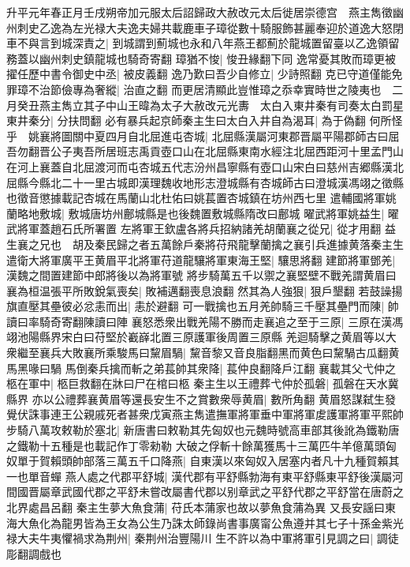 升平元年春正月壬戌朔帝加元服太后詔歸政大赦改元太后徙居崇德宫　燕主雋徵幽州刺史乙逸為左光禄大夫逸夫婦共載鹿車子璋從數十騎服飾甚麗奉迎於道逸大怒閉車不與言到城深責之|{
	到城謂到薊城也永和八年燕王都薊於龍城置留臺以乙逸領留務蓋以幽州刺史鎮龍城也騎奇寄翻}
璋猶不悛|{
	悛丑緣翻下同}
逸常憂其敗而璋更被擢任歷中書令御史中丞|{
	被皮義翻}
逸乃歎曰吾少自修立|{
	少詩照翻}
克已守道僅能免罪璋不治節儉專為奢縱|{
	治直之翻}
而更居清顯此豈惟璋之忝幸實時世之陵夷也　二月癸丑燕主雋立其子中山王暐為太子大赦改元光夀　太白入東井秦有司奏太白罰星東井秦分|{
	分扶問翻}
必有暴兵起京師秦主生曰太白入井自為渴耳|{
	為于偽翻}
何所怪乎　姚襄將圖關中夏四月自北屈進屯杏城|{
	北屈縣漢屬河東郡晋屬平陽郡師古曰屈吾勿翻晋公子夷吾所居班志禹貢壺口山在北屈縣東南水經注北屈西距河十里孟門山在河上襄蓋自北屈渡河而屯杏城五代志汾州昌寧縣有壺口山宋白曰慈州吉郷縣漢北屈縣今縣北二十一里古城即漢理魏收地形志澄城縣有杏城師古曰澄城漢馮翊之徵縣也徵音懲據載記杏城在馬蘭山北杜佑曰姚萇置杏城鎮在坊州西七里}
遣輔國將軍姚蘭略地敷城|{
	敷城唐坊州鄜城縣是也後魏置敷城縣隋改曰鄜城}
曜武將軍姚益生|{
	曜武將軍蓋趙石氏所署置}
左將軍王欽盧各將兵招納諸羌胡蘭襄之從兄|{
	從才用翻}
益生襄之兄也　胡及秦民歸之者五萬餘戶秦將苻飛龍擊蘭擒之襄引兵進據黄落秦主生遣衛大將軍廣平王黄眉平北將軍苻道龍驤將軍東海王堅|{
	驤思將翻}
建節將軍鄧羌|{
	漢魏之間置建節中郎將後以為將軍號}
將步騎萬五千以禦之襄堅壁不戰羌謂黄眉曰襄為桓温張平所敗銳氣喪矣|{
	敗補邁翻喪息浪翻}
然其為人強狠|{
	狠戶墾翻}
若鼓譟揚旗直壓其壘彼必忿恚而出|{
	恚於避翻}
可一戰擒也五月羌帥騎三千壓其壘門而陳|{
	帥讀曰率騎奇寄翻陳讀曰陣}
襄怒悉衆出戰羌陽不勝而走襄追之至于三原|{
	三原在漢馮翊池陽縣界宋白曰苻堅於嶻嶭北置三原護軍後周置三原縣}
羌迴騎擊之黄眉等以大衆繼至襄兵大敗襄所乘駿馬曰黧眉騧|{
	黧音黎又音良脂翻黑而黄色曰黧騧古瓜翻黄馬黑喙曰騧}
馬倒秦兵擒而斬之弟萇帥其衆降|{
	萇仲良翻降戶江翻}
襄載其父弋仲之柩在軍中|{
	柩巨救翻在牀曰尸在棺曰柩}
秦主生以王禮葬弋仲於孤磐|{
	孤磐在天水冀縣界}
亦以公禮葬襄黄眉等還長安生不之賞數衆辱黄眉|{
	數所角翻}
黄眉怒謀弑生發覺伏誅事連王公親戚死者甚衆戊寅燕主雋遣撫軍將軍垂中軍將軍䖍護軍將軍平熙帥步騎八萬攻敕勒於塞北|{
	新唐書曰敕勒其先匈奴也元魏時號高車部其後訛為鐵勒唐之鐵勒十五種是也載記作丁零勑勒}
大破之俘斬十餘萬獲馬十三萬匹牛羊億萬頭匈奴單于賀賴頭帥部落三萬五千口降燕|{
	自東漢以來匈奴入居塞内者凡十九種賀賴其一也單音蟬}
燕人處之代郡平舒城|{
	漢代郡有平舒縣勃海有東平舒縣東平舒後漢屬河間國晋屬章武國代郡之平舒未嘗改屬書代郡以别章武之平舒代郡之平舒當在唐蔚之北界處昌呂翻}
秦主生夢大魚食蒲|{
	苻氏本蒲家也故以夢魚食蒲為異}
又長安謡曰東海大魚化為龍男皆為王女為公生乃誅太師錄尚書事廣甯公魚遵并其七子十孫金紫光禄大夫牛夷懼禍求為荆州|{
	秦荆州治豐陽川}
生不許以為中軍將軍引見調之曰|{
	調徒彫翻調戲也}
